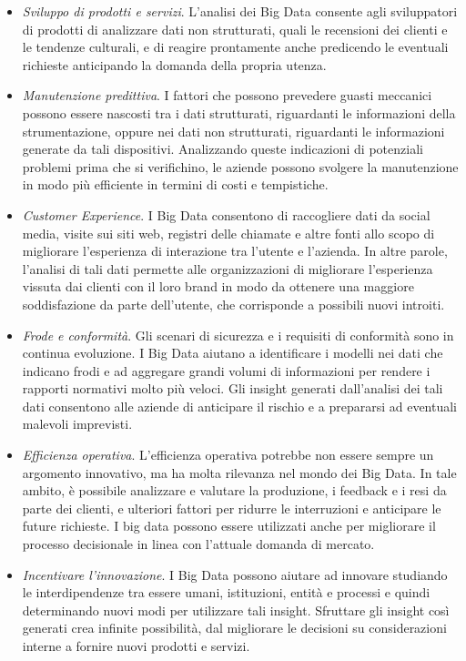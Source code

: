 \begin{itemize}
    \item \textit{Sviluppo di prodotti e servizi}. L’analisi dei Big Data consente agli sviluppatori di prodotti di analizzare dati non strutturati, quali le recensioni dei clienti e le tendenze culturali, e di reagire prontamente anche predicendo le eventuali richieste anticipando la domanda della propria utenza.
    \item \textit{Manutenzione predittiva}. I fattori che possono prevedere guasti meccanici possono essere nascosti tra i dati strutturati, riguardanti le informazioni della strumentazione, oppure nei dati non strutturati, riguardanti le informazioni generate da tali dispositivi. Analizzando queste indicazioni di potenziali problemi prima che si verifichino, le aziende possono svolgere la manutenzione in modo più efficiente in termini di costi e tempistiche.
    \item \textit{Customer Experience}. I Big Data consentono di raccogliere dati da social media, visite sui siti web, registri delle chiamate e altre fonti allo scopo di migliorare l’esperienza di interazione tra l’utente e l’azienda. In altre parole, l’analisi di tali dati permette alle organizzazioni di migliorare l’esperienza vissuta dai clienti con il loro brand in modo da ottenere una maggiore soddisfazione da parte dell’utente, che corrisponde a possibili nuovi introiti.
    \item \textit{Frode e conformità}. Gli scenari di sicurezza e i requisiti di conformità sono in continua evoluzione. I Big Data aiutano a identificare i modelli nei dati che indicano frodi e ad aggregare grandi volumi di informazioni per rendere i rapporti normativi molto più veloci. Gli insight generati dall’analisi dei tali dati consentono alle aziende di anticipare il rischio e a prepararsi ad eventuali malevoli imprevisti.
    \item \textit{Efficienza operativa}. L’efficienza operativa potrebbe non essere sempre un argomento innovativo, ma ha molta rilevanza nel mondo dei Big Data. In tale ambito, è possibile analizzare e valutare la produzione, i feedback e i resi da parte dei clienti, e ulteriori fattori per ridurre le interruzioni e anticipare le future richieste. I big data possono essere utilizzati anche per migliorare il processo decisionale in linea con l’attuale domanda di mercato.
    \item \textit{Incentivare l’innovazione}. I Big Data possono aiutare ad innovare studiando le interdipendenze tra essere umani, istituzioni, entità e processi e quindi determinando nuovi modi per utilizzare tali insight. Sfruttare gli insight così generati crea infinite possibilità, dal migliorare le decisioni su considerazioni interne a fornire nuovi prodotti e servizi.
\end{itemize}

